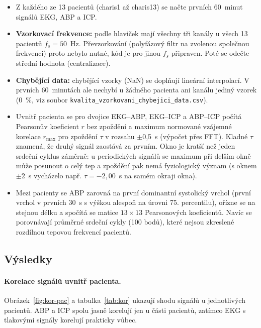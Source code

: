 \documentclass[11pt,a4paper]{article}
\begin{document}
\begin{itemize}
  \item Z každého ze 13 pacientů (charis1 až charis13) se načte prvních 60~minut signálů EKG, ABP a ICP.
  \item \textbf{Vzorkovací frekvence:} podle hlaviček mají všechny tři kanály u všech 13 pacientů
        $f_s = 50$~Hz. Převzorkování (polyfázový filtr na zvolenou společnou frekvenci) proto nebylo
        nutné, kód je pro jinou $f_s$ připraven. Poté se odečte střední hodnota (centralizace).
  \item \textbf{Chybějící data:} chybějící vzorky (NaN) se doplňují lineární interpolací. V prvních
        60~minutách ale nechybí u žádného pacienta ani kanálu jediný vzorek (0~\%, viz soubor
        \texttt{kvalita\_vzorkovani\_chybejici\_data.csv}).
  \item Uvnitř pacienta se pro dvojice EKG--ABP, EKG--ICP a ABP--ICP počítá Pearsonův koeficient
        $r$ bez zpoždění a maximum normované vzájemné korelace $r_{\max}$ pro zpoždění $\tau$
        v rozsahu $\pm$0,5~s (výpočet přes FFT). Kladné $\tau$ znamená, že druhý signál zaostává
        za prvním. Okno je kratší než jeden srdeční cyklus záměrně: u periodických signálů se
        maximum při delším okně může posunout o celý tep a zpoždění pak nemá fyziologický význam
        (s oknem $\pm$2~s vycházelo např. $\tau = -2{,}00$~s na samém okraji okna).
  \item Mezi pacienty se ABP zarovná na první dominantní systolický vrchol (první vrchol v prvních
        30~s s výškou alespoň na úrovni 75. percentilu), ořízne se na stejnou délku a spočítá
        se matice $13\times 13$ Pearsonových koeficientů. Navíc se porovnávají průměrné srdeční
        cykly (100 bodů), které nejsou zkreslené rozdílnou tepovou frekvencí pacientů.
\end{itemize}

\subsection{Výsledky}
\paragraph{Korelace signálů uvnitř pacienta.}
Obrázek~\ref{fig:kor-pac} a tabulka~\ref{tab:kor} ukazují shodu signálů u jednotlivých pacientů.
ABP a ICP spolu jasně korelují jen u části pacientů, zatímco EKG s tlakovými signály korelují
prakticky vůbec.
\end{document}
